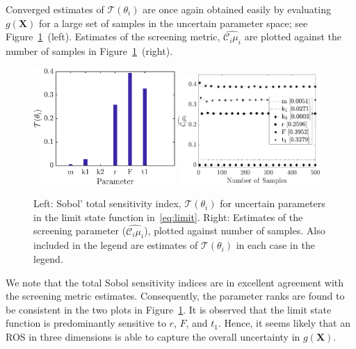 Converged estimates of $\mathcal{T}(\theta_i)$ are once again obtained easily by
evaluating $g(\bm{X})$ for a large set of samples in the uncertain 
parameter space; see Figure~\ref{fig:sense_osc}~(left). Estimates of the screening metric, 
$\widehat{\mathcal{C}_i\mu_i}$ are plotted against the number of samples in 
Figure~\ref{fig:sense_osc}~(right). 
\begin{figure}[htbp]
 \begin{center}
  \includegraphics[width=0.48\textwidth]{./Figures/sense_oscillator}
  \includegraphics[width=0.48\textwidth]{./Figures/ub_conv_oscillator}
\caption{
Left: Sobol' total sensitivity index, $\mathcal{T}(\theta_i)$ for uncertain parameters in the limit 
state function in~\eqref{eq:limit}. Right: 
Estimates of the screening parameter ($\widehat{\mathcal{C}_i\mu_i}$), plotted
against number of samples. Also included in the legend are estimates of $\mathcal{T}(\theta_i)$
in each case in the legend.}
\label{fig:sense_osc}
\end{center}
\end{figure}
We note that the total Sobol sensitivity indices are in excellent agreement
with the screening metric estimates. 
Consequently, the parameter ranks are found to be consistent in the
two plots in  
Figure~\ref{fig:sense_osc}.
It is observed that the limit state function is predominantly sensitive 
to $r$, $F$, and $t_1$. Hence, it seems likely that an ROS in
three dimensions is able to capture the overall uncertainty in $g(\bm{X})$.
